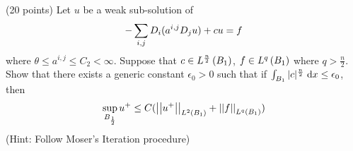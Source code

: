 (20 points)
Let $u$ be a weak sub-solution of
\begin{align*}
  -\sum_{i, j} \graddir{i}(a^{i, j} \graddir{j} u) + c u = f
\end{align*}
where $\theta \leq a^{i, j} \leq C_2 < \infty$.
Suppose that $c \in \lnfunc{B_1}{\frac{n}{2}}$, $f \in \lnfunc{B_1}{q}$
where $q > \frac{n}{2}$.
Show that there exists a generic constant $\epsilon_0 > 0$ such that if
$\int_{B_1} |c|^{\frac{n}{2}} \dx \leq \epsilon_0$, then
\begin{align*}
  \sup_{B_{\frac{1}{2}}} u^+ \leq C ( \lnorm{u^+}{2}{B_1} + \lnorm{f}{q}{B_1} )
\end{align*}
(Hint: Follow Moser's Iteration procedure)
